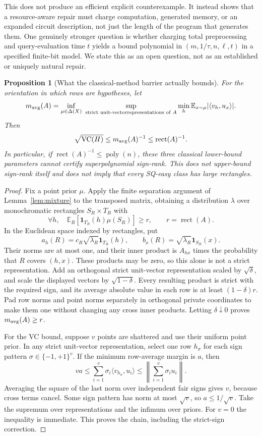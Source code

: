 \documentclass[11pt]{article}
\newtheorem{proposition}[theorem]{Proposition}
\DeclareMathOperator{\rect}{rect}
\newcommand{\E}{\mathbb E}
\newcommand{\1}{\mathbf 1}
\begin{document}
This does not produce an efficient explicit counterexample. It instead shows that a resource-aware repair must charge computation, generated memory, or an expanded circuit description, not just the length of the program that generates them. One genuinely stronger question is whether charging total preprocessing and query-evaluation time $t$ yields a bound polynomial in $(m,1/\tau,n,\ell,t)$ in a specified finite-bit model. We state this as an open question, not as an established or uniquely natural repair.

\begin{samepage}
\begin{proposition}[What the classical-method barrier actually bounds]\label{thm:classicalbarrier}
For the orientation in which rows are hypotheses, let
\[
 m_{\rm avg}(A)=\inf_{\mu\in\Delta(X)}\ 
 \sup_{\substack{\text{strict unit-vector}\text{representations of }A}}
 \min_h\E_{x\sim\mu}|\langle v_h,u_x\rangle|.
\]
Then
\[
 \sqrt{\operatorname{VC}(H)}\le m_{\rm avg}(A)^{-1}\le\rect(A)^{-1}.
\]
In particular, if $\rect(A)^{-1}\le\operatorname{poly}(n)$, these three classical lower-bound parameters cannot certify superpolynomial sign-rank. This does not upper-bound sign-rank itself and does not imply that every SQ-easy class has large rectangles.
\end{proposition}
\end{samepage}
\begin{proof}
Fix a point prior $\mu$. Apply the finite separation argument of Lemma~\ref{lem:mixture} to the transposed matrix, obtaining a distribution $\lambda$ over monochromatic rectangles $S_R\times T_R$ with
\[
 \forall h,\quad\E_R[\1_{T_R}(h)\mu(S_R)]\ge r,
 \qquad r=\rect(A).
\]
In the Euclidean space indexed by rectangles, put
\[
 a_h(R)=c_R\sqrt{\lambda_R}\1_{T_R}(h),\qquad
 b_x(R)=\sqrt{\lambda_R}\1_{S_R}(x).
\]
Their norms are at most one, and their inner product is $A_{hx}$ times the probability that $R$ covers $(h,x)$. These products may be zero, so this alone is not a strict representation. Add an orthogonal strict unit-vector representation scaled by $\sqrt\delta$, and scale the displayed vectors by $\sqrt{1-\delta}$. Every resulting product is strict with the required sign, and its average absolute value in each row is at least $(1-\delta)r$. Pad row norms and point norms separately in orthogonal private coordinates to make them one without changing any cross inner products. Letting $\delta\downarrow0$ proves $m_{\rm avg}(A)\ge r$.

For the VC bound, suppose $v$ points are shattered and use their uniform point prior. In any strict unit-vector representation, select one row $h_\sigma$ for each sign pattern $\sigma\in\{-1,+1\}^v$. If the minimum row-average margin is $a$, then
\[
 va\le\sum_{i=1}^v\sigma_i\langle v_{h_\sigma},u_i\rangle
 \le\left\|\sum_{i=1}^v\sigma_i u_i\right\|.
\]
Averaging the square of the last norm over independent fair signs gives $v$, because cross terms cancel. Some sign pattern has norm at most $\sqrt v$, so $a\le1/\sqrt v$. Take the supremum over representations and the infimum over priors. For $v=0$ the inequality is immediate. This proves the chain, including the strict-sign correction.
\end{proof}
\end{document}
